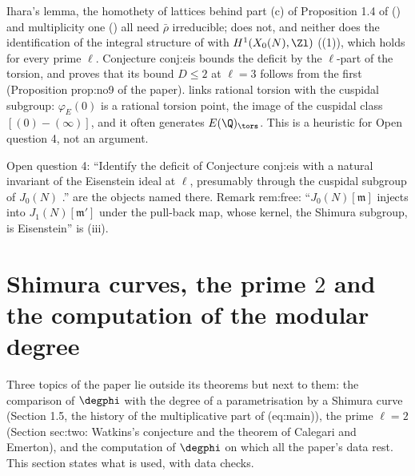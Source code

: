 \begin{remark}\label{rem:moddeg:eisenstein-and-the-paper}
Ihara's lemma, the homothety of lattices behind part (c) of Proposition 1.4 of \cite{DFG04} () and multiplicity one () all need $\bar\rho$ irreducible;
 does not, and neither does the identification of the integral structure of \cite{DFG04} with $H^1(X_0(N),\Zl)$ ((1)), which holds
for every prime $\ell$. Conjecture conj:eis bounds the deficit by the $\ell$-part of the torsion, and
 proves that its bound $D\le2$ at $\ell=3$ follows from the first (Proposition prop:no9 of the paper).  links rational torsion with the
cuspidal subgroup: $\varphi_E(0)$ is a rational torsion point, the image of the cuspidal class $[(0)-(\infty)]$, and it often generates $E(\Q)_{\tors}$. This is a heuristic for Open question 4, not an
argument.
\end{remark}

\begin{paperlink}\label{pl:moddeg:eis}
Open question 4: ``Identify the deficit of Conjecture conj:eis with a natural invariant of the Eisenstein ideal at $\ell$, presumably through the cuspidal subgroup of $J_0(N)$ \cite{Mazur77}.''
 are the objects named there. Remark rem:free: ``$J_0(N)[\mathfrak m]$ injects into
$J_1(N)[\mathfrak m']$ under the pull-back map, whose kernel, the Shimura subgroup, is Eisenstein'' is (iii).
\end{paperlink}

\section[Shimura curves, the prime 2, computing the degree]{Shimura curves, the prime \texorpdfstring{$2$}{2} and the computation of the modular degree}\label{sec:moddeg:shimura-two}

Three topics of the paper lie outside its theorems but next to them: the comparison of $\degphi$ with the degree of a parametrisation by a Shimura curve (Section 1.5, the history of the
multiplicative part of (eq:main)), the prime $\ell=2$ (Section sec:two: Watkins's conjecture and the theorem of Calegari and Emerton), and the computation of $\degphi$ on which all the
paper's data rest. This section states what is used, with data checks.

